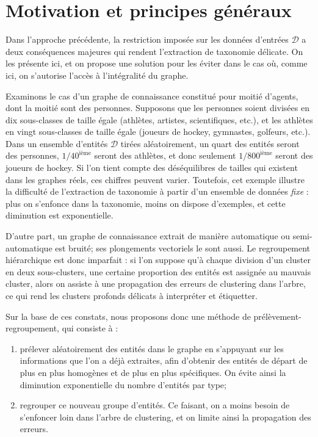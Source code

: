 \section{Motivation et principes généraux}

Dans l'approche précédente, la restriction imposée sur les données d'entrées $\mathcal{D}$ a deux conséquences majeures qui rendent l'extraction de taxonomie délicate. On les présente ici, et on propose une solution pour les éviter dans le cas où, comme ici, on s'autorise l'accès à l'intégralité du graphe.


Examinons le cas d'un graphe de connaissance constitué pour moitié d'agents, dont la moitié sont des personnes. Supposons que les personnes soient divisées en dix sous-classes de taille égale (athlètes, artistes, scientifiques, etc.), et les athlètes en vingt sous-classes de taille égale (joueurs de hockey, gymnastes, golfeurs, etc.). Dans un ensemble d'entités $\mathcal{D}$ tirées aléatoirement, un quart des entités seront des personnes, $1/40^\textrm{ième}$ seront des athlètes, et donc seulement $1/800^\textrm{ième}$ seront des joueurs de hockey. Si l'on tient compte des déséquilibres de tailles qui existent dans les graphes réels, ces chiffres peuvent varier. Toutefois, cet exemple illustre la difficulté de l'extraction de taxonomie à partir d'un ensemble de données \textit{fixe} : plus on s'enfonce dans la taxonomie, moins on dispose d'exemples, et cette diminution est exponentielle.

D'autre part, un graphe de connaissance extrait de manière automatique ou semi-automatique est bruité; ses plongements vectoriels le sont aussi. Le regroupement hiérarchique est donc imparfait : si l'on suppose qu'à chaque division d'un cluster en deux sous-clusters, une certaine proportion des entités est assignée au mauvais cluster, alors on assiste à une propagation des erreurs de clustering dans l'arbre, ce qui rend les clusters profonds délicats à interpréter et étiquetter. 

Sur la base de ces constats, nous proposons donc une méthode de prélèvement-regroupement, qui consiste à :
\renewcommand{\theenumi}{\alph{enumi}}
\begin{enumerate}
    \item prélever aléatoirement des entités dans le graphe en s'appuyant sur les informations que l'on a déjà extraites, afin d'obtenir des entités de départ de plus en plus homogènes et de plus en plus spécifiques. On évite ainsi la diminution exponentielle du nombre d'entités par type;
    \item regrouper ce nouveau groupe d'entités. Ce faisant, on a moins besoin de s'enfoncer loin dans l'arbre de clustering, et on  limite ainsi la propagation des erreurs.
\end{enumerate}

